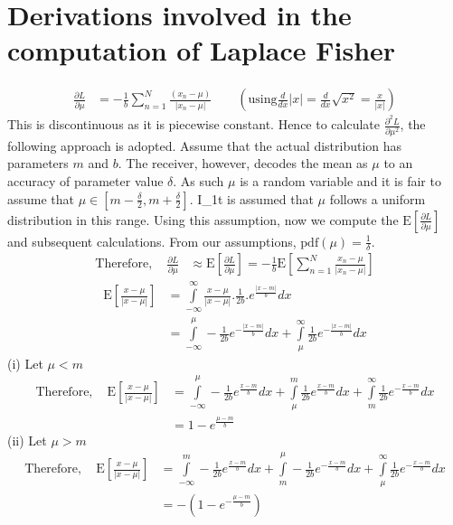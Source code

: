 \documentclass[wcp]{jmlr}
\begin{document}
\section{Derivations involved in the computation of Laplace Fisher}
\label{apd:laplace_fisher}
\begin{align*}
 \frac{\partial L}{\partial \mu} &= -\frac{1}{b} \sum_{n=1}^N \frac{(x_n-\mu)}{|x_n-\mu|} \quad\quad\left(\mathrm{using} \frac{d}{dx}|x| = \frac{d}{dx}\sqrt{x^2} = \frac{x}{|x|}\right)
\end{align*}
This is discontinuous as it is piecewise constant. Hence to calculate $\frac{\partial^2 L}{\partial \mu^2}$, the following approach is adopted.
Assume that the actual distribution has parameters $m$ and 
$b$. The receiver, however, decodes the mean as $\mu$ to an accuracy of parameter
value $\delta$. As such $\mu$ is a random variable and it is fair to assume 
that $\mu \in \left[m-\frac{\delta}{2},m+\frac{\delta}{2}\right]$. I_1t is 
assumed that $\mu$ follows a uniform distribution in this range. Using this 
assumption, now we compute the $\mathrm{E}\left[\frac{\partial L}{\partial \mu}\right]$ 
and subsequent calculations. From our assumptions, $\mathrm{pdf}(\mu) = \frac{1}{\delta}$.
\begin{align*}
 \mathrm{Therefore,}\quad \frac{\partial L}{\partial \mu} &\approx \mathrm{E}\left[\frac{\partial L}{\partial \mu}\right] = -\frac{1}{b}\mathrm{E}\left[\sum_{n=1}^{N}\frac{x_n-\mu}{|x_n-\mu|}\right]
\end{align*}
\begin{align*}
 \mathrm{E}\left[\frac{x-\mu}{|x-\mu|}\right] &= \int\limits_{-\infty}^{\infty} \frac{x-\mu}{|x-\mu|}.\frac{1}{2b}.e^{\frac{|x-m|}{b}} dx \\
 &= \int\limits_{-\infty}^{\mu} -\frac{1}{2b} e^{-\frac{|x-m|}{b}} dx + \int\limits_{\mu}^{\infty} \frac{1}{2b} e^{-\frac{|x-m|}{b}} dx
\end{align*}
(i) Let $\mu < m$
\begin{align*}
 \mathrm{Therefore,}\quad \mathrm{E}\left[\frac{x-\mu}{|x-\mu|}\right] &= \int\limits_{-\infty}^{\mu} -\frac{1}{2b} e^{\frac{x-m}{b}} dx + \int\limits_{\mu}^{m} \frac{1}{2b} e^{\frac{x-m}{b}} dx + \int\limits_{m}^{\infty} \frac{1}{2b} e^{-\frac{x-m}{b}} dx \\
 &= 1 - e^{\frac{\mu-m}{b}}
\end{align*}
(ii) Let $\mu > m$
\begin{align*}
 \mathrm{Therefore,}\quad \mathrm{E}\left[\frac{x-\mu}{|x-\mu|}\right] &= \int\limits_{-\infty}^{m} -\frac{1}{2b} e^{\frac{x-m}{b}} dx + \int\limits_{m}^{\mu} -\frac{1}{2b} e^{-\frac{x-m}{b}} dx + \int\limits_{\mu}^{\infty} \frac{1}{2b} e^{-\frac{x-m}{b}} dx \\
 &= -(1 - e^{-\frac{\mu-m}{b}})
\end{align*}
\end{document}
